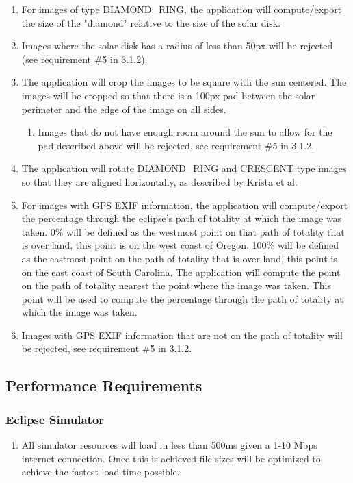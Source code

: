 \documentclass[10pt, onecolumn, draftclsnofoot, letterpaper, compsoc]{IEEEtran}
\begin{document}
\begin{enumerate}
		\item For images of type DIAMOND\_RING, the application will 
		compute/export the size of the "diamond" relative to the size of 
		the solar disk.

		\item Images where the solar disk has a radius of less than 50px
		will be rejected (see requirement \#5 in 3.1.2).

		\item The application will crop the images to be square with the 
		sun centered. The images will be cropped so that there is a 100px
		pad between the solar perimeter and the edge of the image on all 
		sides.
		\begin{enumerate}
			\item Images that do not have enough room around the sun to 
			allow for the pad described above will be rejected, see requirement \#5 in 3.1.2.
		\end{enumerate}

		\item The application will rotate DIAMOND\_RING and CRESCENT type 
		images so that they are aligned horizontally, as described by 
		Krista et al.

		\item For images with GPS EXIF information, the application will 
		compute/export the percentage through the eclipse’s path of 
		totality at which the image was taken. 0\% will be defined as the 
		westmost point on that path of totality that is over land, this 
		point is on the west coast of Oregon. 100\% will be defined as the 
		eastmost point on the path of totality that is over land, this 
		point is on the east coast of South Carolina. The application will
		compute the point on the path of totality nearest the point where 
		the image was taken. This point will be used to compute the 
		percentage through the path of totality at which the image was 
		taken.

		\item Images with GPS EXIF information that are not on the path of
		totality will be rejected, see requirement \#5 in 3.1.2.

	\end{enumerate}

\subsection{Performance Requirements}

\subsubsection{Eclipse Simulator}
	\begin{enumerate}
		\item All simulator resources will load in less than 500ms given a 1-10
		 Mbps internet connection. Once this is achieved file sizes will be 
		 optimized to achieve the fastest load time possible.
	\end{enumerate}
\end{document}
